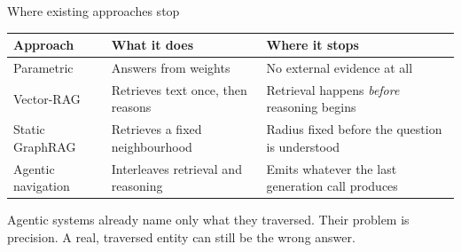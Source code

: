 \begin{frame}{Where existing approaches stop}
  \begin{table}
    \small
    \setlength{\tabcolsep}{4pt}
    \renewcommand{\arraystretch}{1.1}
    \begin{tabular}{@{}L{31mm}L{56mm}L{45mm}@{}}
      \toprule
      \textbf{Approach} & \textbf{What it does} & \textbf{Where it stops} \\
      \midrule
      Parametric        & Answers from weights
                        & No external evidence at all \\
      \midrule
      Vector-RAG        & Retrieves text once, then reasons
                        & Retrieval happens \emph{before} reasoning begins \\
      \midrule
      Static GraphRAG   & Retrieves a fixed neighbourhood
                        & Radius fixed before the question is understood \\
      \midrule
      Agentic navigation & Interleaves retrieval and reasoning
                        & Emits whatever the last generation call produces \\
      \bottomrule
    \end{tabular}
  \end{table}
  {\small Agentic systems already name only what they traversed. Their
  problem is \alert{precision}. A real, traversed entity can still be the
  wrong answer.\par}
\end{frame}

